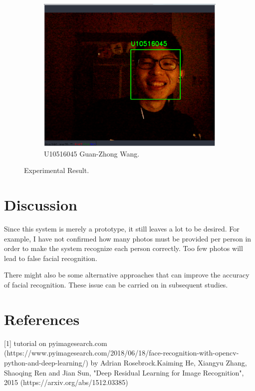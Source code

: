 \documentclass[14pt]{report}
\begin{document}
\begin{figure}[h!]
\begin{subfigure}[b]{0.32\linewidth}
            \includegraphics[width=\linewidth]{exp45.eps}
            \caption{U10516045 Guan-Zhong Wang.}
        \end{subfigure}
        \caption{Experimental Result.}
    \label{fig:coffee}
\end{figure}


\section{Discussion}
Since this system is merely a prototype, it still leaves a lot to be desired. For example, I have
not confirmed how many photos must be provided per person in order to make the system recognize each person
correctly. Too few photos will lead to false facial recognition.
\newline

There might also be some alternative approaches that can improve the accuracy of facial recognition. These
issue can be carried on in subsequent studies.


\section{References}
[1] tutorial on pyimagesearch.com (https://www.pyimagesearch.com/2018/06/18/face-recognition-with-opencv-python-and-deep-learning/) by Adrian Rosebrock.\newline\newline
[2] Kaiming He, Xiangyu Zhang, Shaoqing Ren and Jian Sun, "Deep Residual Learning for Image Recognition", 2015 (https://arxiv.org/abs/1512.03385)
\end{document}
